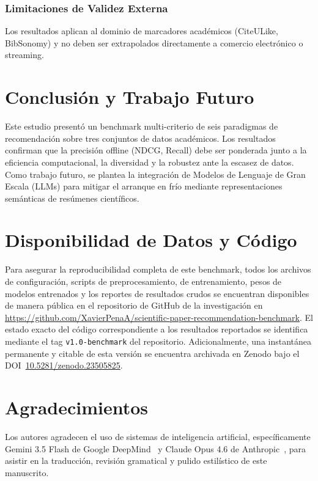 \documentclass[journal]{IEEEtran}
\begin{document}
\subsubsection{Limitaciones de Validez Externa}
Los resultados aplican al dominio de marcadores académicos (CiteULike, BibSonomy) y no deben ser extrapolados directamente a comercio electrónico o streaming.

\section{Conclusión y Trabajo Futuro}
\label{sec:conclusion}

Este estudio presentó un benchmark multi-criterio de seis paradigmas de recomendación sobre tres conjuntos de datos académicos. Los resultados confirman que la precisión offline (NDCG, Recall) debe ser ponderada junto a la eficiencia computacional, la diversidad y la robustez ante la escasez de datos. Como trabajo futuro, se plantea la integración de Modelos de Lenguaje de Gran Escala (LLMs) para mitigar el arranque en frío mediante representaciones semánticas de resúmenes científicos.

\section*{Disponibilidad de Datos y Código}
Para asegurar la reproducibilidad completa de este benchmark, todos los archivos de configuración, scripts de preprocesamiento, de entrenamiento, pesos de modelos entrenados y los reportes de resultados crudos se encuentran disponibles de manera pública en el repositorio de GitHub de la investigación en \url{https://github.com/XavierPenaA/scientific-paper-recommendation-benchmark}. El estado exacto del código correspondiente a los resultados reportados se identifica mediante el tag \texttt{v1.0-benchmark} del repositorio. Adicionalmente, una instantánea permanente y citable de esta versión se encuentra archivada en Zenodo bajo el DOI~\href{https://doi.org/10.5281/zenodo.23505825}{10.5281/zenodo.23505825}.

\section*{Agradecimientos}
Los autores agradecen el uso de sistemas de inteligencia artificial, específicamente Gemini 3.5 Flash de Google DeepMind~\cite{gemini2026} y Claude Opus 4.6 de Anthropic~\cite{claude2026}, para asistir en la traducción, revisión gramatical y pulido estilístico de este manuscrito.



\end{document}
